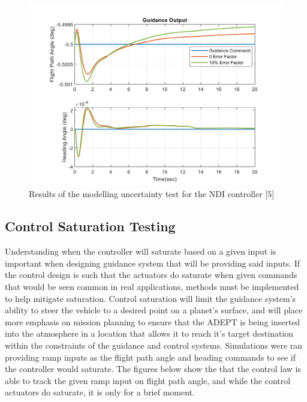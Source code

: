 \documentclass[12pt]{article}
\numberwithin{equation}{section}
\numberwithin{figure}{section}
\numberwithin{table}{section}
\begin{document}
\begin{figure}[H]
  \centering
  \includegraphics[width=1\textwidth]{Figures/NDI_Parameter_Uncertainty.png}
  \caption{Results of the modelling uncertainty test for the NDI controller [5]}
  \label{fig:Param_Uncertainty}
\end{figure}

\subsection{Control Saturation Testing}
Understanding when the controller will saturate based on a given input is important when designing guidance system that will be providing said inputs. If the control design is such that the actuators do saturate when given commands that would be seen common in real applications, methods must be implemented to help mitigate saturation. Control saturation will limit the guidance system's ability to steer the vehicle to a desired point on a planet's surface, and will place more emphasis on mission planning to ensure that the ADEPT is being inserted into the atmosphere in a location that allows it to reach it's target destination within the constraints of the guidance and control systems. Simulations were ran providing ramp inputs as the flight path angle and heading commands to see if the controller would saturate. The figures below show the that the control law is able to track the given ramp input on flight path angle, and while the control actuators do saturate, it is only for a brief moment.
\end{document}
